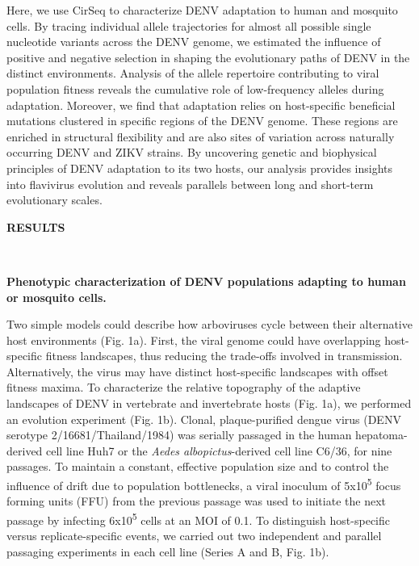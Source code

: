 \documentclass[
]{article}
\begin{document}
Here, we use CirSeq to characterize DENV adaptation to human and
mosquito cells. By tracing individual allele trajectories for almost all
possible single nucleotide variants across the DENV genome, we estimated
the influence of positive and negative selection in shaping the
evolutionary paths of DENV in the distinct environments. Analysis of the
allele repertoire contributing to viral population fitness reveals the
cumulative role of low-frequency alleles during adaptation. Moreover, we
find that adaptation relies on host-specific beneficial mutations
clustered in specific regions of the DENV genome. These regions are
enriched in structural flexibility and are also sites of variation
across naturally occurring DENV and ZIKV strains. By uncovering genetic
and biophysical principles of DENV adaptation to its two hosts, our
analysis provides insights into flavivirus evolution and reveals
parallels between long and short-term evolutionary scales.

\textbf{RESULTS}

~

\textbf{Phenotypic characterization of DENV populations adapting to
human or mosquito cells.}

Two simple models could describe how arboviruses cycle between their
alternative host environments (Fig. 1a). First, the viral genome could
have overlapping host-specific fitness landscapes, thus reducing the
trade-offs involved in transmission. Alternatively, the virus may have
distinct host-specific landscapes with offset fitness maxima. To
characterize the relative topography of the adaptive landscapes of DENV
in vertebrate and invertebrate hosts (Fig. 1a), we performed an
evolution experiment (Fig. 1b). Clonal, plaque-purified dengue virus
(DENV serotype 2/16681/Thailand/1984) was serially passaged in the human
hepatoma-derived cell line Huh7 or the \emph{Aedes albopictus}-derived
cell line C6/36, for nine passages. To maintain a constant, effective
population size and to control the influence of drift due to population
bottlenecks, a viral inoculum of 5x10\textsuperscript{5} focus forming
units (FFU) from the previous passage was used to initiate the next
passage by infecting 6x10\textsuperscript{5} cells at an MOI of 0.1. To
distinguish host-specific versus replicate-specific events, we carried
out two independent and parallel passaging experiments in each cell line
(Series A and B, Fig. 1b).
\end{document}
